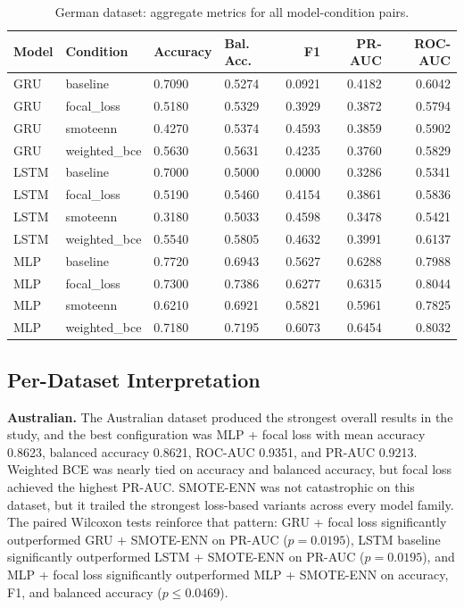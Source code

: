 \documentclass[11pt,a4paper]{article}
\begin{document}
\begin{table}[htbp]
\centering
\scriptsize
\caption{German dataset: aggregate metrics for all model-condition pairs.}
\label{tab:german-all}
\begin{tabular}{llllrrr}
\toprule
Model & Condition & Accuracy & Bal. Acc. & F1 & PR-AUC & ROC-AUC \\
\midrule
GRU & baseline & 0.7090 & 0.5274 & 0.0921 & 0.4182 & 0.6042 \\
GRU & focal\_loss & 0.5180 & 0.5329 & 0.3929 & 0.3872 & 0.5794 \\
GRU & smoteenn & 0.4270 & 0.5374 & 0.4593 & 0.3859 & 0.5902 \\
GRU & weighted\_bce & 0.5630 & 0.5631 & 0.4235 & 0.3760 & 0.5829 \\
LSTM & baseline & 0.7000 & 0.5000 & 0.0000 & 0.3286 & 0.5341 \\
LSTM & focal\_loss & 0.5190 & 0.5460 & 0.4154 & 0.3861 & 0.5836 \\
LSTM & smoteenn & 0.3180 & 0.5033 & 0.4598 & 0.3478 & 0.5421 \\
LSTM & weighted\_bce & 0.5540 & 0.5805 & 0.4632 & 0.3991 & 0.6137 \\
MLP & baseline & 0.7720 & 0.6943 & 0.5627 & 0.6288 & 0.7988 \\
MLP & focal\_loss & 0.7300 & 0.7386 & 0.6277 & 0.6315 & 0.8044 \\
MLP & smoteenn & 0.6210 & 0.6921 & 0.5821 & 0.5961 & 0.7825 \\
MLP & weighted\_bce & 0.7180 & 0.7195 & 0.6073 & 0.6454 & 0.8032 \\
\bottomrule
\end{tabular}
\end{table}

\subsection*{Per-Dataset Interpretation}
\textbf{Australian.} The Australian dataset produced the strongest overall results in the study, and the best configuration was MLP + focal loss with mean accuracy 0.8623, balanced accuracy 0.8621, ROC-AUC 0.9351, and PR-AUC 0.9213. Weighted BCE was nearly tied on accuracy and balanced accuracy, but focal loss achieved the highest PR-AUC. SMOTE-ENN was not catastrophic on this dataset, but it trailed the strongest loss-based variants across every model family. The paired Wilcoxon tests reinforce that pattern: GRU + focal loss significantly outperformed GRU + SMOTE-ENN on PR-AUC (\(p = 0.0195\)), LSTM baseline significantly outperformed LSTM + SMOTE-ENN on PR-AUC (\(p = 0.0195\)), and MLP + focal loss significantly outperformed MLP + SMOTE-ENN on accuracy, F1, and balanced accuracy (\(p \leq 0.0469\)).
\end{document}
